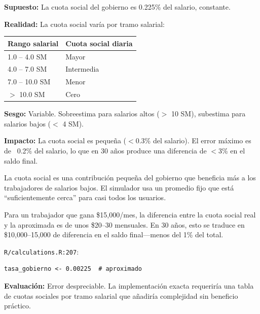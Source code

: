 \documentclass[11pt,a4paper]{report}
\begin{document}
\begin{tcolorbox}[colback=blue!5!white, colframe=blue!75!black, title=\textbf{Definici\'on Formal}]
\textbf{Supuesto:} La cuota social del gobierno es 0.225\% del salario, constante.

\textbf{Realidad:} La cuota social var\'ia por tramo salarial:
\begin{center}
\begin{tabular}{ll}
\toprule
\textbf{Rango salarial} & \textbf{Cuota social diaria} \\
\midrule
1.0 -- 4.0 SM & Mayor \\
4.0 -- 7.0 SM & Intermedia \\
7.0 -- 10.0 SM & Menor \\
$>$ 10.0 SM & Cero \\
\bottomrule
\end{tabular}
\end{center}

\textbf{Sesgo:} Variable. Sobreestima para salarios altos ($>$ 10 SM), subestima para salarios bajos ($<$ 4 SM).

\textbf{Impacto:} La cuota social es peque\~na ($<$0.3\% del salario). El error m\'aximo es de ~0.2\% del salario, lo que en 30 a\~nos produce una diferencia de $<$3\% en el saldo final.
\end{tcolorbox}

\begin{tcolorbox}[colback=green!5!white, colframe=green!50!black, title=\textbf{Intuici\'on}]
La cuota social es una contribuci\'on peque\~na del gobierno que beneficia m\'as a los trabajadores de salarios bajos. El simulador usa un promedio fijo que est\'a ``suficientemente cerca'' para casi todos los usuarios.

Para un trabajador que gana \$15,000/mes, la diferencia entre la cuota social real y la aproximada es de unos \$20--30 mensuales. En 30 a\~nos, esto se traduce en \$10,000--15,000 de diferencia en el saldo final---menos del 1\% del total.
\end{tcolorbox}

\begin{tcolorbox}[colback=orange!5!white, colframe=orange!75!black, title=\textbf{Aplicaci\'on en C\'odigo}]
\texttt{R/calculations.R:207}:
\begin{lstlisting}
tasa_gobierno <- 0.00225  # aproximado
\end{lstlisting}

\textbf{Evaluaci\'on:} Error despreciable. La implementaci\'on exacta requerir\'ia una tabla de cuotas sociales por tramo salarial que a\~nadir\'ia complejidad sin beneficio pr\'actico.
\end{tcolorbox}
\end{document}
